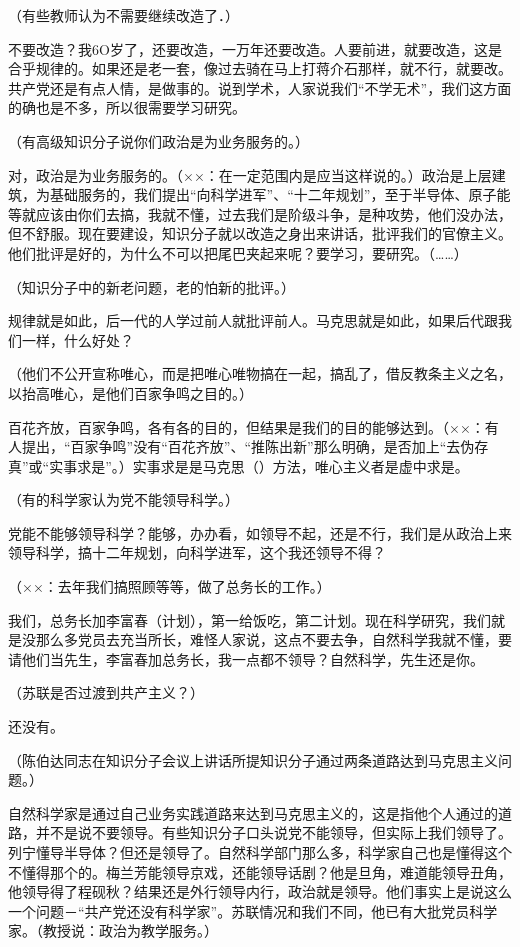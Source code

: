 （有些教师认为不需要继续改造了．）

不要改造？我6O岁了，还要改造，一万年还要改造。人要前进，就要改造，这是合乎规律的。如果还是老一套，像过去骑在马上打蒋介石那样，就不行，就要改。共产党还是有点人情，是做事的。说到学术，人家说我们“不学无术”，我们这方面的确也是不多，所以很需要学习研究。

（有高级知识分子说你们政治是为业务服务的。）

对，政治是为业务服务的。（××：在一定范围内是应当这样说的。）政治是上层建筑，为基础服务的，我们提出“向科学进军”、“十二年规划”，至于半导体、原子能等就应该由你们去搞，我就不懂，过去我们是阶级斗争，是种攻势，他们没办法，但不舒服。现在要建设，知识分子就以改造之身出来讲话，批评我们的官僚主义。他们批评是好的，为什么不可以把尾巴夹起来呢？要学习，要研究。（……）

（知识分子中的新老问题，老的怕新的批评。）

规律就是如此，后一代的人学过前人就批评前人。马克思就是如此，如果后代跟我们一样，什么好处？

（他们不公开宣称唯心，而是把唯心唯物搞在一起，搞乱了，借反教条主义之名，以抬高唯心，是他们百家争鸣之目的。）

百花齐放，百家争鸣，各有各的目的，但结果是我们的目的能够达到。（××：有人提出，“百家争鸣”没有“百花齐放”、“推陈出新”那么明确，是否加上“去伪存真”或“实事求是”。）实事求是是马克思（）方法，唯心主义者是虚中求是。

（有的科学家认为党不能领导科学。）

党能不能够领导科学？能够，办办看，如领导不起，还是不行，我们是从政治上来领导科学，搞十二年规划，向科学进军，这个我还领导不得？

（××：去年我们搞照顾等等，做了总务长的工作。）

我们，总务长加李富春（计划），第一给饭吃，第二计划。现在科学研究，我们就是没那么多党员去充当所长，难怪人家说，这点不要去争，自然科学我就不懂，要请他们当先生，李富春加总务长，我一点都不领导？自然科学，先生还是你。

（苏联是否过渡到共产主义？）

还没有。

（陈伯达同志在知识分子会议上讲话所提知识分子通过两条道路达到马克思主义问题。）

自然科学家是通过自己业务实践道路来达到马克思主义的，这是指他个人通过的道路，并不是说不要领导。有些知识分子口头说党不能领导，但实际上我们领导了。列宁懂导半导体？但还是领导了。自然科学部门那么多，科学家自己也是懂得这个不懂得那个的。梅兰芳能领导京戏，还能领导话剧？他是旦角，难道能领导丑角，他领导得了程砚秋？结果还是外行领导内行，政治就是领导。他们事实上是说这么一个问题－“共产党还没有科学家”。苏联情况和我们不同，他已有大批党员科学家。（教授说：政治为教学服务。）

